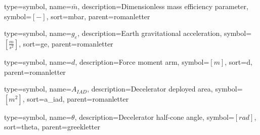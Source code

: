 {
type=symbol, %
name={\ensuremath{\bar{m}}}, %
description={Dimensionless mass efficiency parameter}, %
symbol={$\left[-\right]$}, %
sort=mbar, %
parent=romanletter %
}

{
type=symbol, %
name={\ensuremath{g_{e}}}, %
description={Earth gravitational acceleration}, %
symbol={$\left[\frac{m}{s^2} \right]$}, %
sort=ge, %
parent=romanletter %
}

{
	type=symbol, %
	name={\ensuremath{d}}, %
	description={Force moment arm}, %
	symbol={$\left[m \right]$}, %
	sort=d, %
	parent=romanletter %
}

{
type=symbol, %
name={\ensuremath{A_{IAD}}}, %
description={Decelerator deployed area}, %
symbol={$\left[m^2 \right]$}, %
sort=a_iad, %
parent=romanletter %
}

{
type=symbol, %
name={\ensuremath{\theta}}, %
description={Decelerator half-cone angle}, %
symbol={$\left[rad \right]$}, %
sort=theta, %
parent=greekletter %
}

